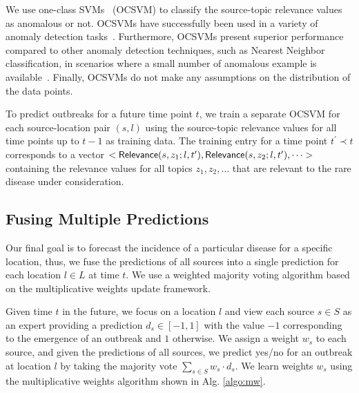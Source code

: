 \documentclass[twoside,leqno,twocolumn]{article}
\begin{document}
We use one-class SVMs~\cite{schoelkopf:99} (OCSVM) to classify the source-topic relevance values as anomalous or not. OCSVMs have successfully been used in a variety of anomaly detection tasks~\cite{manevitz:2002,steinwart:05, heller:03}. Furthermore, OCSVMs present superior performance compared to other anomaly detection techniques, such as Nearest Neighbor classification, in scenarios where a small number of anomalous example is available~\cite{khan:13}. Finally, OCSVMs do not make any assumptions on the distribution of the data points.


To predict outbreaks for a future time point $t$, we train a separate OCSVM for each source-location pair $(s, l)$ using the source-topic relevance values for all time points up to $t-1$ as training data.  The training entry for a time point $t^{\prime} \prec t$ corresponds to a vector $<{\sf Relevance}(s,z_1;l,t^{\prime}), {\sf Relevance}(s,z_2;l,t^{\prime}), \dots>$ containing the relevance values for all topics $z_1, z_2, \dots$ that are relevant to the rare disease under consideration. 
\vspace{-10pt}
\subsection{Fusing Multiple Predictions}
\label{sec:integration}
Our final goal is to forecast the incidence of a particular disease for a specific location, thus, we fuse the predictions of all sources into a single prediction for each location $l \in L$ at time $t$. We use a weighted majority voting algorithm based on the multiplicative weights update framework\cite{arora:2012}.

Given time $t$ in the future, we focus on a location $l$ and view each source $s \in S$ as an expert providing a prediction $d_s \in [-1,1]$ with the value $-1$ corresponding to the emergence of an outbreak and $1$ otherwise. We assign a weight $w_s$ to each source, and given the predictions of all sources, we predict yes/no for an outbreak at location $l$ by taking the majority vote $\sum_{s \in S} w_s \cdot d_s$.  We learn weights $w_s$ using the multiplicative weights algorithm shown in Alg. \ref{algo:mw}.
\end{document}
